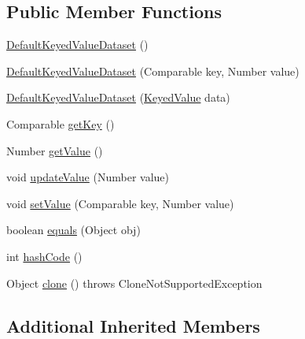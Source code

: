 \subsection*{Public Member Functions}
\begin{DoxyCompactItemize}
\item 
\mbox{\hyperlink{classorg_1_1jfree_1_1data_1_1general_1_1_default_keyed_value_dataset_aa6359bd189049498b4b1c1e0b0bed904}{Default\+Keyed\+Value\+Dataset}} ()
\item 
\mbox{\hyperlink{classorg_1_1jfree_1_1data_1_1general_1_1_default_keyed_value_dataset_ab8f10bd152c9cfa269dca8bfa5496187}{Default\+Keyed\+Value\+Dataset}} (Comparable key, Number value)
\item 
\mbox{\hyperlink{classorg_1_1jfree_1_1data_1_1general_1_1_default_keyed_value_dataset_ad9c1daae055edc5b7be74697030d5955}{Default\+Keyed\+Value\+Dataset}} (\mbox{\hyperlink{interfaceorg_1_1jfree_1_1data_1_1_keyed_value}{Keyed\+Value}} data)
\item 
Comparable \mbox{\hyperlink{classorg_1_1jfree_1_1data_1_1general_1_1_default_keyed_value_dataset_a295e1097c6ecf63b20cb1de7570aebd0}{get\+Key}} ()
\item 
Number \mbox{\hyperlink{classorg_1_1jfree_1_1data_1_1general_1_1_default_keyed_value_dataset_af2554d604d08db7255c29290c009bb6c}{get\+Value}} ()
\item 
void \mbox{\hyperlink{classorg_1_1jfree_1_1data_1_1general_1_1_default_keyed_value_dataset_a0bd536785abeee624d6b449a8402b572}{update\+Value}} (Number value)
\item 
void \mbox{\hyperlink{classorg_1_1jfree_1_1data_1_1general_1_1_default_keyed_value_dataset_a0611e6d31d37cc25079ec034fa3f91a1}{set\+Value}} (Comparable key, Number value)
\item 
boolean \mbox{\hyperlink{classorg_1_1jfree_1_1data_1_1general_1_1_default_keyed_value_dataset_ac46f6c782c4bff5530f89decb8b70966}{equals}} (Object obj)
\item 
int \mbox{\hyperlink{classorg_1_1jfree_1_1data_1_1general_1_1_default_keyed_value_dataset_a9c9504395a1ac30ad81b5ecebe4fa34b}{hash\+Code}} ()
\item 
Object \mbox{\hyperlink{classorg_1_1jfree_1_1data_1_1general_1_1_default_keyed_value_dataset_a2d214bcc040200bfd0d3fb545b6f9472}{clone}} ()  throws Clone\+Not\+Supported\+Exception 
\end{DoxyCompactItemize}
\subsection*{Additional Inherited Members}


